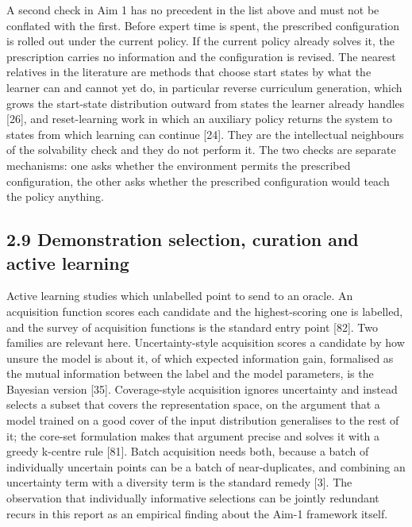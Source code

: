 \documentclass[
  11pt,
]{article}
\begin{document}
A second check in Aim 1 has no precedent in the list above and must not
be conflated with the first. Before expert time is spent, the prescribed
configuration is rolled out under the current policy. If the current
policy already solves it, the prescription carries no information and
the configuration is revised. The nearest relatives in the literature
are methods that choose start states by what the learner can and cannot
yet do, in particular reverse curriculum generation, which grows the
start-state distribution outward from states the learner already handles
{[}26{]}, and reset-learning work in which an auxiliary policy returns
the system to states from which learning can continue {[}24{]}. They are
the intellectual neighbours of the solvability check and they do not
perform it. The two checks are separate mechanisms: one asks whether the
environment permits the prescribed configuration, the other asks whether
the prescribed configuration would teach the policy anything.

\hypertarget{demonstration-selection-curation-and-active-learning}{%
\subsection{2.9 Demonstration selection, curation and active
learning}\label{demonstration-selection-curation-and-active-learning}}

Active learning studies which unlabelled point to send to an oracle. An
acquisition function scores each candidate and the highest-scoring one
is labelled, and the survey of acquisition functions is the standard
entry point {[}82{]}. Two families are relevant here. Uncertainty-style
acquisition scores a candidate by how unsure the model is about it, of
which expected information gain, formalised as the mutual information
between the label and the model parameters, is the Bayesian version
{[}35{]}. Coverage-style acquisition ignores uncertainty and instead
selects a subset that covers the representation space, on the argument
that a model trained on a good cover of the input distribution
generalises to the rest of it; the core-set formulation makes that
argument precise and solves it with a greedy k-centre rule {[}81{]}.
Batch acquisition needs both, because a batch of individually uncertain
points can be a batch of near-duplicates, and combining an uncertainty
term with a diversity term is the standard remedy {[}3{]}. The
observation that individually informative selections can be jointly
redundant recurs in this report as an empirical finding about the Aim-1
framework itself.
\end{document}
